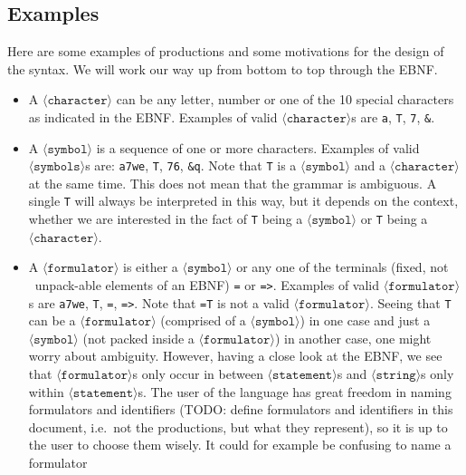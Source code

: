 \documentclass[british]{article}
\newcommand\prv{bc}
\newcommand\m[1]{\texttt{#1}}
\begin{document}
\subsection{Examples}

Here are some examples of productions and some motivations for the
design of the syntax. We will work our way up from bottom to top through
the EBNF.

\begin{itemize}
	\item
		A $\langle\texttt{character}\rangle$ can be any letter, number or
		one of the 10 special characters as indicated in the EBNF\@. Examples
		of valid $\langle\texttt{character}\rangle$s are \m{a}, \m{T},
		\m{7}, \m{&}.
	\item
		A $\langle\texttt{symbol}\rangle$ is a sequence of one or more
		characters. Examples of valid $\langle\texttt{symbols}\rangle$s are:
		\m{a7we}, \m{T}, \m{76}, \m{&q}. Note that \m{T} is a 
		$\langle\texttt{symbol}\rangle$ and a $\langle\texttt{character}\rangle$
		at the same time. This does not mean that the grammar is ambiguous.
		A single \m{T} will always be interpreted in this way, but it depends
		on the context, whether we are interested in the fact of \m{T} being a
		$\langle\texttt{symbol} \rangle$ or \m{T} being a 
		$\langle\texttt{character}\rangle$.
	\item
		A $\langle\texttt{formulator}\rangle$ is either a
		$\langle\texttt{symbol}\rangle$ or any one of the terminals (fixed, not
		\textquotedbl\ unpack-able \textquotedbl{} elements of an EBNF) \m{=} or
		\m{=>}. Examples of valid $\langle\texttt{formulator}\rangle$s are
		\m{a7we}, \m{T}, \m{=}, \m{=>}.  Note that \m{=T} is not a valid
		$\langle\texttt{formulator}\rangle$.  Seeing that \m{T} can be a
		$\langle\texttt{formulator}\rangle$ (comprised of a
		$\langle\texttt{symbol}\rangle$) in one case and just a
		$\langle\texttt{symbol}\rangle$ (not packed inside a
		$\langle\texttt{formulator}\rangle$) in another case, one might worry
		about ambiguity. However, having a close look at the EBNF, we see that
		$\langle\texttt{formulator}\rangle$s only occur in between
		$\langle\texttt{statement}\rangle$s and $\langle\texttt{string}\rangle$s
		only within $\langle\texttt{statement}\rangle$s. The user of the
		language has great freedom in naming formulators and identifiers (TODO:
		define formulators and identifiers in this document, i.e.\ not the
		productions, but what they represent), so it is up to the user to choose
		them wisely. It could for example be confusing to name a formulator

\end{itemize}
\end{document}
